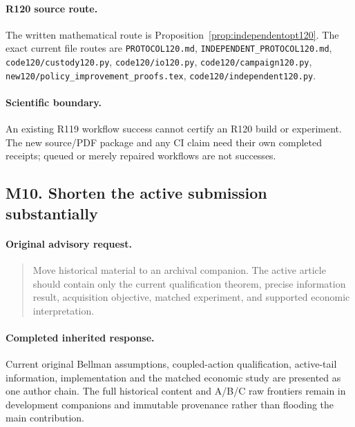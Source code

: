 \paragraph{R120 source route.}
The written mathematical route is Proposition~\ref{prop:independentopt120}. The exact current file routes are \nolinkurl{PROTOCOL120.md}, \nolinkurl{INDEPENDENT_PROTOCOL120.md}, \nolinkurl{code120/custody120.py}, \nolinkurl{code120/io120.py}, \nolinkurl{code120/campaign120.py}, \nolinkurl{new120/policy_improvement_proofs.tex}, \nolinkurl{code120/independent120.py}.
\paragraph{Scientific boundary.}
An existing R119 workflow success cannot certify an R120 build or experiment. The new source/PDF package and any CI claim need their own completed receipts; queued or merely repaired workflows are not successes.

\subsection{M10. Shorten the active submission substantially}
\label{response120:M10}
\paragraph{Original advisory request.}
\begin{quote}
Move historical material to an archival companion. The active article should contain only the current qualification theorem, precise information result, acquisition objective, matched experiment, and supported economic interpretation.
\end{quote}
\paragraph{Completed inherited response.}
Current original Bellman assumptions, coupled-action qualification, active-tail information, implementation and the matched economic study are presented as one author chain. The full historical content and A/B/C raw frontiers remain in development companions and immutable provenance rather than flooding the main contribution.

